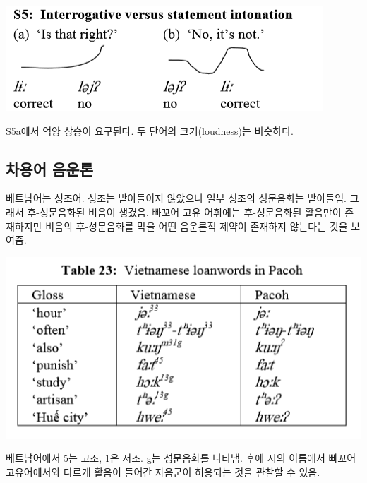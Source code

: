 \includegraphics{Pacoh/src/PacohS5.png}

S5a에서 억양 상승이 요구된다. 두 단어의 크기(loudness)는 비슷하다.

\subsection{차용어 음운론}
베트남어는 성조어. 성조는 받아들이지 않았으나 일부 성조의 성문음화는 받아들임. 그래서 후-성문음화된 비음이 생겼음. 빠꼬어 고유 어휘에는 후-성문음화된 활음만이 존재하지만 비음의 후-성문음화를 막을 어떤 음운론적 제약이 존재하지 않는다는 것을 보여줌.

\includegraphics{Pacoh/src/PacohTable23.png}

베트남어에서 5는 고조, 1은 저조. g는 성문음화를 나타냄. 후에 시의 이름에서 빠꼬어 고유어에서와 다르게 활음이 들어간 자음군이 허용되는 것을 관찰할 수 있음.
